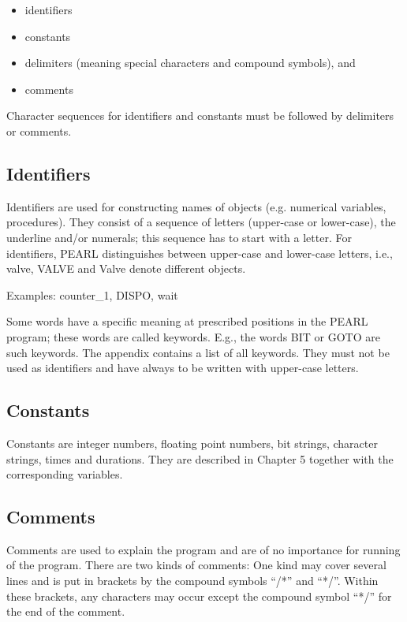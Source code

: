 \begin{itemize}
\item identifiers
\item constants
\item delimiters (meaning special characters and compound symbols), and
\item comments
\end{itemize}

Character sequences for identifiers and constants must be followed by
delimiters or comments.

\subsection{Identifiers}   %

Identifiers are used for constructing names of objects (e.g. numerical
variables, procedures). They consist of a sequence of letters
(upper-case or lower-case), the underline and/or numerals; this sequence
has to start with a letter. For identifiers, PEARL distinguishes between
upper-case and lower-case letters, i.e., valve, VALVE and Valve denote
different objects.

Examples: counter\_1, DISPO, wait

Some words have a specific meaning at prescribed positions in the PEARL
program; these words are called keywords. E.g., the words BIT or GOTO
are such keywords. The appendix contains a list of all keywords. They
must not be used as identifiers and have always to be written with
upper-case letters.

\subsection{Constants}   %

Constants are integer numbers, floating point numbers, bit strings,
character strings, times and durations. They are described in Chapter 5
together with the corresponding variables.

\subsection{Comments}    %

Comments are used to explain the program and are of no importance for
running of the program. There are two kinds of comments: One kind may
cover several lines and is put in brackets by the compound symbols ``/*''
and ``*/''. Within these brackets, any characters may occur except the
compound symbol ``*/'' for the end of the comment.

